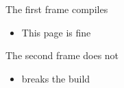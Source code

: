 \documentclass[11pt,aspectratio=169]{beamer}
\begin{document}
\begin{frame}{The first frame compiles}
  \begin{itemize}
    \item This page is fine
  \end{itemize}
\end{frame}

\begin{frame}{The second frame does not}
  \begin{itemize}
    \item \undefinedfixturemacro{} breaks the build
  \end{itemize}
\end{frame}
\end{document}
